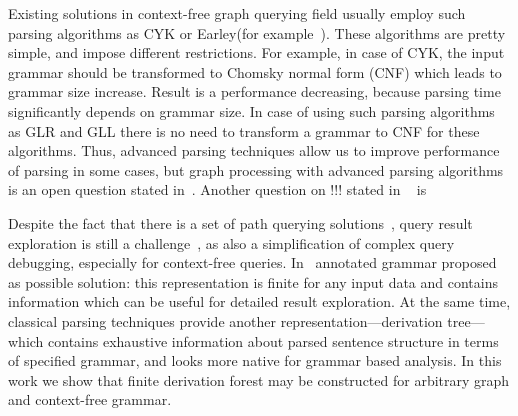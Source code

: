 \documentclass[runningheads,a4paper]{llncs}
\begin{document}

Existing solutions in context-free graph querying field usually employ such parsing algorithms as CYK or Earley(for example~\cite{ConjCFPathQuery,CFGonRDF,GraphQueryWithEarley}). 
These algorithms are pretty simple, and impose different restrictions.
For example, in case of CYK, the input grammar should be transformed to Chomsky normal form (CNF) which leads to grammar size increase. 
Result is a performance decreasing, because parsing time significantly depends on grammar size.
In case of using such parsing algorithms as GLR and GLL there is no need to transform a grammar to CNF for these algorithms.
Thus, advanced parsing techniques allow us to improve performance of parsing in some cases, but graph processing with advanced parsing algorithms~\cite{Grune} is an open question stated in~\cite{Hellings16}.
Another question on !!! stated in ~\cite{Hellings16} is 

Despite the fact that there is a set of path querying solutions~\cite{GraphQueryWithEarley,ConjCFPathQuery,QueryGraphWithData,RegularDBQuery}, query result exploration is still a challenge~\cite{hofman2015separabilityForRegQueryDebugging}, as also a simplification of complex query debugging, especially for context-free queries.
In~\cite{Hellings16} annotated grammar proposed as possible solution: this representation is finite for any input data and contains information which can be useful for detailed result exploration.
At the same time, classical parsing techniques provide another representation---derivation tree---which contains exhaustive information about parsed sentence structure in terms of specified grammar, and looks more native for grammar based analysis.
In this work we show that finite derivation forest may be constructed for arbitrary graph and context-free grammar.
\end{document}
